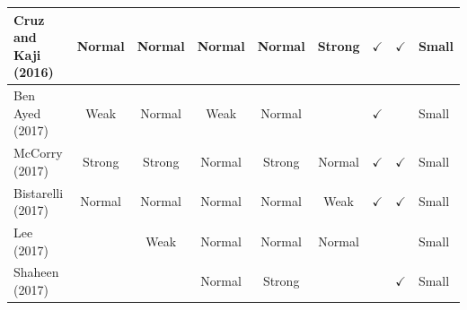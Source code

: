 \documentclass[../access.tex]{subfiles}
\begin{document}
\begin{table}[htbp]
\begin{adjustwidth}{-1cm}{}
\begin{tabular}{m{4.4cm} c c c c c c c >{\centering\arraybackslash}m{0.7cm}}
            \hline
            \footnotesize{Cruz and Kaji (2016) \cite{Cruz2016}}                 & {Normal}                                                                                          & {Normal}                                         & {Normal}               & {Normal}                     & {Strong}                  & $ \checkmark $          & $ \checkmark $            & \footnotesize{Small} \\
            \hline
            \footnotesize{Ben Ayed (2017) \cite{BenAyed2017}}                   & {Weak}                                                                                            & {Normal}                                         & {Weak}                 & {Normal}                     & {}                        & $ \checkmark $          & {}                        & \footnotesize{Small} \\
            \hline
            \footnotesize{McCorry (2017) \cite{McCorry2017}}                    & {Strong}                                                                                          & {Strong}                                         & {Normal}               & {Strong}                     & {Normal}                  & $ \checkmark $          & $ \checkmark $            & \footnotesize{Small} \\
            \hline
            \footnotesize{Bistarelli (2017) \cite{Bistarelli2017}}              & {Normal}                                                                                          & {Normal}                                         & {Normal}               & {Normal}                     & {Weak}                    & $ \checkmark $          & $ \checkmark $            & \footnotesize{Small} \\
            \hline
            \footnotesize{Lee (2017) \cite{Lee2017}}                            & {}                                                                                                & {Weak}                                           & {Normal}               & {Normal}                     & {Normal}                  & {}                      & {}                        & \footnotesize{Small} \\
            \hline
            \footnotesize{Shaheen (2017) \cite{Shaheen2017}}                    & {}                                                                                                & {}                                               & {Normal}               & {Strong}                     & {}                        & {}                      & $ \checkmark $            & \footnotesize{Small} \\

\end{tabular}
\end{adjustwidth}
\end{table}
\end{document}
